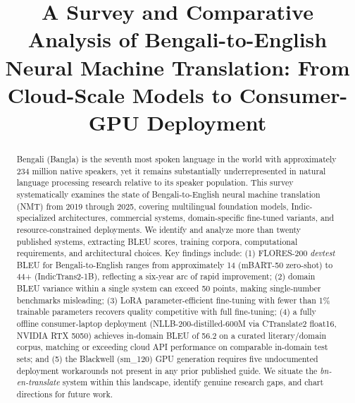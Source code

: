 \documentclass[conference]{IEEEtran}
\begin{document}

\title{A Survey and Comparative Analysis of Bengali-to-English Neural
Machine Translation: From Cloud-Scale Models to Consumer-GPU Deployment}

\author{%
}

\maketitle

\begin{abstract}
Bengali (Bangla) is the seventh most spoken language in the world with
approximately 234 million native speakers, yet it remains substantially
underrepresented in natural language processing research relative to its
speaker population.
This survey systematically examines the state of Bengali-to-English
neural machine translation (NMT) from 2019 through 2025, covering
multilingual foundation models, Indic-specialized architectures, commercial
systems, domain-specific fine-tuned variants, and resource-constrained
deployments.
We identify and analyze more than twenty published systems, extracting
BLEU scores, training corpora, computational requirements, and architectural
choices.
Key findings include: (1) FLORES-200 \textit{devtest} BLEU for Bengali-to-English
ranges from approximately 14 (mBART-50 zero-shot) to 44+ (IndicTrans2-1B),
reflecting a six-year arc of rapid improvement; (2) domain BLEU variance
within a single system can exceed 50 points, making single-number
benchmarks misleading; (3) LoRA parameter-efficient fine-tuning with
fewer than 1\% trainable parameters recovers quality competitive with
full fine-tuning; (4) a fully offline consumer-laptop deployment
(NLLB-200-distilled-600M via CTranslate2 float16, NVIDIA RTX 5050) achieves
in-domain BLEU of 56.2 on a curated literary/domain corpus, matching or
exceeding cloud API performance on comparable in-domain test sets; and
(5) the Blackwell (sm\_120) GPU generation requires five undocumented
deployment workarounds not present in any prior published guide.
We situate the \textit{bn-en-translate} system within this landscape,
identify genuine research gaps, and chart directions for future work.
\end{abstract}
\end{document}
